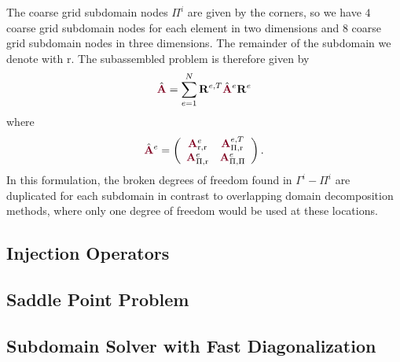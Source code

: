 The coarse grid subdomain nodes $\Pi^i$ are given by the corners, so we have $4$ coarse grid subdomain nodes for each element in two dimensions and $8$ coarse grid subdomain nodes in three dimensions.
The remainder of the subdomain we denote with $\text{r}$.
The subassembled problem is therefore given by
\begin{equation}
\hat{\color{burgundy}\mathbf{A}} = \sum_{e = 1}^N \mathbf{R}^{e, T} \hat{\color{burgundy}\mathbf{A}}^e \mathbf{R}^e
\label{eq:subassembled}
\end{equation}
where
\begin{equation}
\hat{\color{burgundy}\mathbf{A}}^e =
\left( \begin{array}{c c}
{\color{burgundy}\mathbf{A}}_{\text{r}, \text{r}}^e  &  {\color{burgundy}\mathbf{A}}_{\Pi, \text{r}}^{e, T}  \\
{\color{burgundy}\mathbf{A}}_{\Pi, \text{r}}^e       &  {\color{burgundy}\mathbf{A}}_{\Pi, \Pi}^e            \\
\end{array} \right).
\end{equation}
In this formulation, the broken degrees of freedom found in $\Gamma^i - \Pi^i$ are duplicated for each subdomain in contrast to overlapping domain decomposition methods, where only one degree of freedom would be used at these locations.

\subsection{Injection Operators}


\subsection{Saddle Point Problem}


\subsection{Subdomain Solver with Fast Diagonalization}

